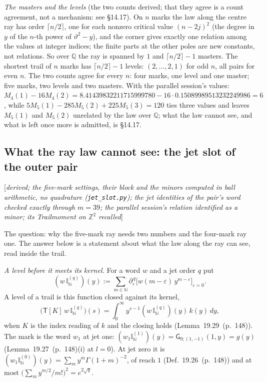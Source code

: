 \documentclass[11pt]{article}
\newcommand{\sG}{\mathsf G}
\newcommand{\sT}{\mathsf T}
\newcommand{\status}[1]{\hfill{\small[\textit{#1}]}}
\newcommand{\hb}[2]{#1~(p.~#2)}   %
\theoremstyle{plain}
\theoremstyle{remark}
\begin{document}
\emph{The masters and the levels} (the two counts derived; that they agree is a count agreement, not a mechanism: see \S14.17). On $n$ marks the law along the centre ray has order $\lceil n/2\rceil$, one for each nonzero critical value $(n-2j)^2$ (the degree in $y$ of the $n$-th power of $\vartheta^2-y$), and the corner gives exactly one relation among the values at integer indices; the finite parts at the other poles are new constants, not relations. So over $\mathbb Q$ the ray is spanned by $1$ and $\lceil n/2\rceil-1$ masters. The shortest trail of $n$ marks has $\lceil n/2\rceil-1$ levels: $(2,\dots,2,1)$ for odd $n$, all pairs for even $n$. The two counts agree for every $n$: four marks, one level and one master; five marks, two levels and two masters. With the parallel session's values: $M_4(1)-16M_4(2)=8.41439832211715999780-16\cdot0.15089989513232249986=6$, while $5M_5(1)-285M_5(2)+225M_5(3)=120$ ties three values and leaves $M_5(1)$ and $M_5(2)$ unrelated by the law over $\mathbb Q$; what the law cannot see, and what is left once more is admitted, is \S14.17.

\subsection{What the ray law cannot see: the jet slot of the outer pair}\status{derived; the five-mark settings, their block and the minors computed in ball arithmetic, no quadrature (\texttt{jet\_slot.py}); the jet identities of the pair's word checked exactly through $m=39$; the parallel session's relation identified as a minor; its Trailmoment on $\mathbb Z^2$ recalled}

The question: why the five-mark ray needs two numbers and the four-mark ray one. The answer below is a statement about what the law along the ray can see, read inside the trail.

\emph{A level before it meets its kernel.} For a word $w$ and a jet order $q$ put
\[
(w\,\mathbb I^{(q)}_{\mathbb N})(y):=\sum_{m\in\mathbb N}\partial_\varepsilon^{\,q}\big[w(m-\varepsilon)\,y^{m-\varepsilon}\big]_{\varepsilon=0}.
\]
A level of a trail is this function closed against its kernel,
\[
\big(\sT[K]\,w\,\mathbb I^{(q)}_{\mathbb N}\big)(s)=\int_0^\infty y^{s-1}(w\,\mathbb I^{(q)}_{\mathbb N})(y)\,k(y)\,dy,
\]
when $K$ is the index reading of $k$ and the closing holds (Lemma~\hb{19.29}{148}). The mark is the word $w_1$ at jet one: $(w_1\mathbb I^{(1)}_{\mathbb N})(y)=\sG_{0;(1,-1)}(1,y)=g(y)$ (Lemma~\hb{19.27}{148}(i) at $l=0$). At jet zero it is $(w_1\mathbb I^{(0)}_{\mathbb N})(y)=\sum_my^m\Gamma(1+m)^{-2}$, of reach $1$ (Def.~\hb{19.26}{148}) and at most $\big(\sum_my^{m/2}/m!\big)^2=e^{2\sqrt y}$.
\end{document}
